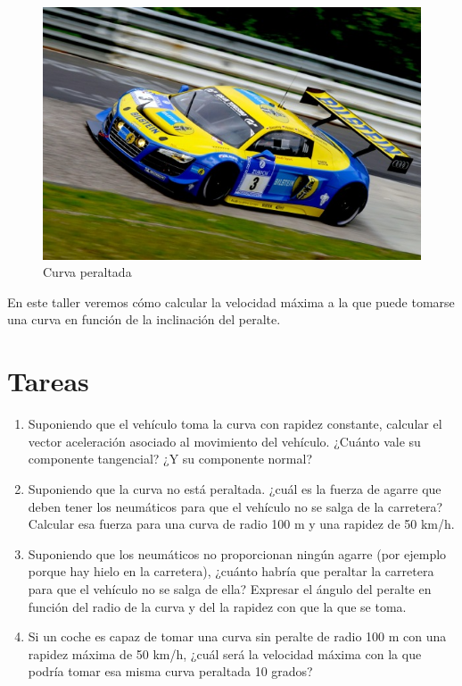 \documentclass[
  a4paper,
]{scrreport}
\begin{document}
\begin{figure}

{\centering \includegraphics{img/peraltado/peralte.jpeg}

}

\caption{Curva peraltada}

\end{figure}

En este taller veremos cómo calcular la velocidad máxima a la que puede
tomarse una curva en función de la inclinación del peralte.

\hypertarget{tareas-5}{%
\section{Tareas}\label{tareas-5}}

\begin{enumerate}
\def\labelenumi{\arabic{enumi}.}
\item
  Suponiendo que el vehículo toma la curva con rapidez constante,
  calcular el vector aceleración asociado al movimiento del vehículo.
  ¿Cuánto vale su componente tangencial? ¿Y su componente normal?
\item
  Suponiendo que la curva no está peraltada. ¿cuál es la fuerza de
  agarre que deben tener los neumáticos para que el vehículo no se salga
  de la carretera? Calcular esa fuerza para una curva de radio 100 m y
  una rapidez de 50 km/h.
\item
  Suponiendo que los neumáticos no proporcionan ningún agarre (por
  ejemplo porque hay hielo en la carretera), ¿cuánto habría que peraltar
  la carretera para que el vehículo no se salga de ella? Expresar el
  ángulo del peralte en función del radio de la curva y del la rapidez
  con que la que se toma.
\item
  Si un coche es capaz de tomar una curva sin peralte de radio 100 m con
  una rapidez máxima de 50 km/h, ¿cuál será la velocidad máxima con la
  que podría tomar esa misma curva peraltada 10 grados?
\end{enumerate}
\end{document}
